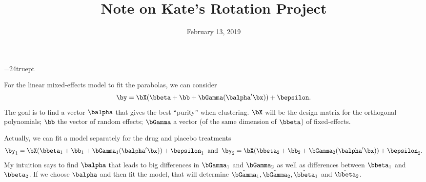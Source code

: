 \documentclass[12pt]{article}
\begin{document}
\baselineskip=24truept



\title{Note on Kate's Rotation Project }

\date{February 13, 2019} \maketitle


For the linear mixed-effects model to fit the parabolas, we can consider
$$\by = \bX(\bbeta +\bb +\bGamma(\balpha'\bx)) + \bepsilon.$$
The goal is to find a vector $\balpha$ that gives the best ``purity'' when clustering.  $\bX$ will be the design matrix for the orthogonal polynomials; $\bb$ the vector of 
random effects; $\bGamma$ a vector (of the same dimension of $\bbeta$) of fixed-effects.

Actually, we can fit a model separately for the drug and placebo treatments
$$\by_1 = \bX(\bbeta_1 +\bb_1 +\bGamma_1(\balpha'\bx)) + \bepsilon_1\;\;\mbox{and}
\;\;
\by_2 = \bX(\bbeta_2 +\bb_2 +\bGamma_2(\balpha'\bx)) + \bepsilon_2.
$$
My intuition says to find $\balpha$ that leads to big differences in $\bGamma_1$ and $\bGamma_2$ as well as differences between $\bbeta_1$
and $\bbeta_2$.  If we choose $\balpha$ and then fit the model, that will determine $\hat{\bGamma}_1, \hat{\bGamma}_2, \hat{\bbeta}_1$ 
and $\hat{\bbeta}_2$.   



\end{document}
